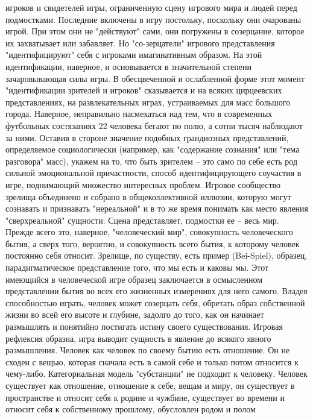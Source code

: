 \documentclass[12pt]{article}
\begin{document}
игроков  и  свидетелей  игры,  ограниченную  сцену  игрового  мира  и  людей  перед  подмостками.  Последние
включены  в  игру  постольку,  поскольку  они  очарованы  игрой.  При  этом  они  не  "действуют"  сами,  они
погружены в созерцание, которое их захватывает или забавляет. Но "со-зерцатели" игрового представления
"идентифицируют"  себя  с  игроками  имагинативным  образом.  На  этой  идентификации,  наверное,  и
основывается в значительной степени зачаровывающая силы игры. В обесцвеченной и ослабленной форме этот
момент  "идентификации  зрителей  и  игроков"  сказывается  и  на  всяких  цирцеевских  представлениях,  на
развлекательных играх, устраиваемых для масс большого города. Наверное, неправильно насмехаться над тем,
что в современных футбольных состязаниях 22 человека бегают по полю, а сотни тысяч наблюдают за ними.
Оставив в стороне значение подобных грандиозных представлений, определяемое социологически (например,
как "содержание сознания" или "тема разговора" масс), укажем на то, что быть зрителем -- это само по себе есть
род  сильной  эмоциональной  причастности,  способ  идентифицирующего  соучастия  в  игре,  поднимающий
множество интересных  проблем.  Игровое  сообщество зрелища  объединено и собрано  в  общеколлективной
иллюзии, которую могут сознавать и признавать "нереальной" и в то же время понимать как место явления
"сверхреальной"  сущности.  Сцена  представляет,  подмостки  ее  --  весь  мир.  Прежде  всего  это,  наверное,
"человеческий мир", совокупность человеческого бытия, а сверх того, вероятно, и совокупность всего бытия, к
которому  человек  постоянно  себя  относит.  Зрелище,  по  существу,  есть  пример  (Bei-Spiel),  образец,
парадигматическое представление того, что мы есть и каковы мы. Этот имеющийся в человеческой игре образец
заключается в осмысленном представлении бытия во всех его жизненных измерениях для него самого. Владея
способностью играть, человек может созерцать себя, обретать образ собственной жизни во всей его высоте и
глубине, задолго до того, как он начинает размышлять и понятийно постигать истину своего существования.
Игровая рефлексия образна, игра выводит сущность в явление до всякого явного размышления. Человек как
человек по своему бытию есть отношение. Он не сходен с вещью, которая сначала есть в самой себе и только
потом  относится  к  чему-либо.  Категориальная  модель  "субстанции"  не  подходит  к  человеку.  Человек
существует как отношение, отношение к себе, вещам и миру, он существует в пространстве и относит себя к
родине и чужбине, существует во времени и относит себя к собственному прошлому, обусловлен родом и полом
\end{document}
